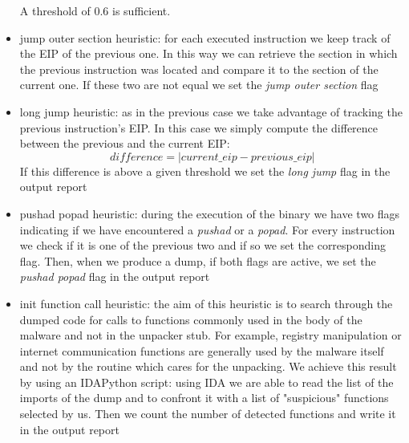 \begin{itemize}
\begin{figure}[!ht]
\end{figure}
A threshold of 0.6 is sufficient.
\item jump outer section heuristic: for each executed instruction we keep track of the EIP of the previous one. In this way we can retrieve the section in which the previous instruction was located and compare it to the section of the current one. If these two are not equal we set the \textit{jump outer section} flag
\item long jump heuristic: as in the previous case we take advantage of tracking the previous instruction's EIP. In this case we simply compute the difference between the previous and the current EIP: 
\begin{equation}
difference = \left|current\_eip - previous\_eip\right|
\end{equation}
If this difference is above a given threshold we set the \textit{long jump} flag in the output report
 \item pushad popad heuristic: during the execution of the binary we have two flags indicating if we have encountered a \textit{pushad} or a \textit{popad}. For every instruction we check if it is one of the previous two and if so we set the corresponding flag. Then, when we produce a dump, if both flags are active, we set the \textit{pushad popad} flag in the output report
\item init function call heuristic: the aim of this heuristic is to search through the dumped code for calls to functions commonly used in the body of the malware and not in the unpacker stub. For example, registry manipulation or internet communication functions are generally used by the malware itself and not by the routine which cares for the unpacking. We achieve this result by using an IDAPython script: using IDA we are able to read the list of the imports of the dump and to confront it with a list of "suspicious" functions selected by us. Then we count the number of detected functions and write it in the output report
\end{itemize} 

